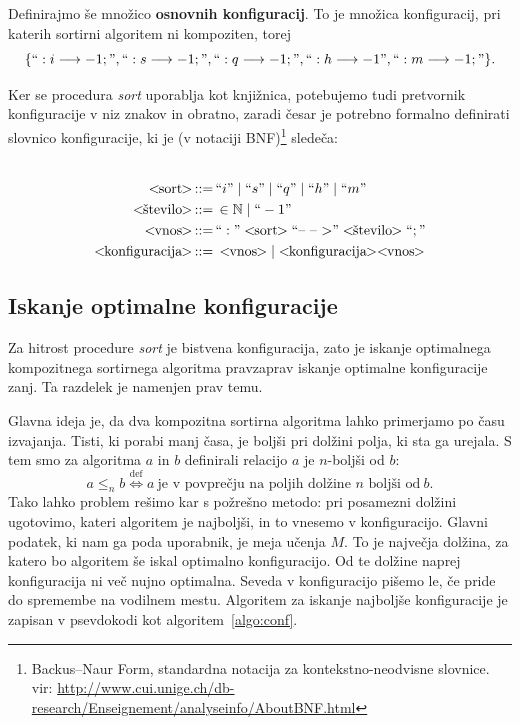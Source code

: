 \documentclass[a4paper,oneside,12pt]{article}
\def\N{\mathbb N}
\def\ali{\;|\;}
\newenvironment{BNF}{
    \\
    \Sbox
    \minipage{12cm}
}{
    \endminipage
    \endSbox
    \minipage{\textwidth}
    \vspace*{5pt}
    \begin{center}
        \fcolorbox{white}{white}{
            \TheSbox
        }
    \end{center}
    \vspace*{5pt}
    \endminipage
}
\def\bnfassign:{\,::=&\,}
\newcommand{\q}[1]{\text{``}#1\text{''}}
\newcommand{\ntm}[1]{\ensuremath{<\!\!\text{#1}\!\!>}}
\newcommand{\abnf}[2]{\ensuremath{\ntm{#1} \bnfassign: #2}}
\newcommand{\lra}{\ensuremath{\longrightarrow}}
\begin{document}

Definirajmo še množico \textbf{osnovnih konfiguracij}. To je množica konfiguracij, pri katerih
sortirni algoritem ni kompoziten, torej 
\[ \{``:i \lra -1;", ``:s \lra -1;", 
``:q \lra -1;", ``:h \lra -1", ``:m \lra -1;"\}. \]

Ker se procedura \emph{sort} uporablja kot knjižnica, potebujemo tudi pretvornik
konfiguracije v niz znakov in obratno, zaradi česar je potrebno formalno definirati slovnico
konfiguracije, ki je (v notaciji BNF)\footnote{
Backus--Naur Form, standardna notacija za kontekstno-neodvisne slovnice.\\
vir: \url{http://www.cui.unige.ch/db-research/Enseignement/analyseinfo/AboutBNF.html}} 
sledeča:
\\
\begin{BNF}
  \begin{align*}
    \abnf{sort}{\q{i} \ali \q{s} \ali \q{q} \ali \q{h} \ali \q{m}}\\
    \abnf{število}{\in \N \ali \q{-1}} \\
    \abnf{vnos}{\q{:}\ntm{sort}\q{\mbox{--}\ \mbox{--}\ \mbox{$>$}}\ntm{število}\q{;}}\\
    \abnf{konfiguracija}{\ntm{vnos} | \ntm{konfiguracija}\ntm{vnos}}
  \end{align*}
\end{BNF}

\subsection{Iskanje optimalne konfiguracije}
\label{chapter:optimalconf}
Za hitrost procedure \emph{sort} je bistvena konfiguracija,
zato je iskanje optimalnega kompozitnega sortirnega algoritma pravzaprav iskanje optimalne
konfiguracije zanj. Ta razdelek je namenjen prav temu.  

Glavna ideja je, da dva kompozitna sortirna algoritma lahko primerjamo po času 
izvajanja. Tisti, ki porabi manj časa, je boljši pri dolžini polja, ki sta
ga urejala. S tem smo za algoritma $a$ in $b$ definirali relacijo $a$ je $n$-boljši od $b$:
\[ a \leq_n b \overset{\text{def}}{\Longleftrightarrow} a\ \text{je v povprečju na poljih dolžine $n$ boljši
od}\ b.\]
Tako lahko problem rešimo kar s požrešno metodo: 
pri posamezni dolžini ugotovimo, kateri algoritem je najboljši, in to vnesemo
v konfiguracijo. Glavni podatek, ki nam ga poda uporabnik, je meja učenja $M$. To je
največja dolžina, za katero bo algoritem še iskal optimalno konfiguracijo. Od te dolžine naprej
konfiguracija ni več nujno optimalna. Seveda v konfiguracijo pišemo le, če pride do 
spremembe na vodilnem mestu. Algoritem za iskanje najboljše konfiguracije je zapisan v
psevdokodi kot algoritem~\ref{algo:conf}.
\end{document}
